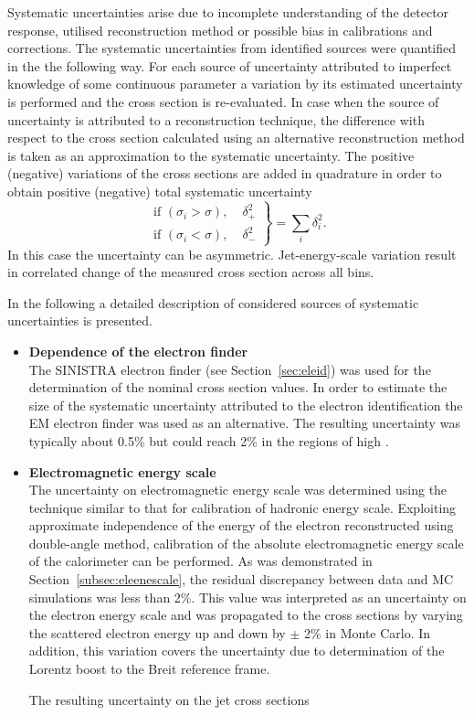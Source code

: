 Systematic uncertainties arise due to incomplete understanding of the detector response, utilised reconstruction method or possible bias in calibrations and corrections. The systematic uncertainties from identified sources were quantified in the the following way. For each source of uncertainty attributed to imperfect knowledge of some continuous parameter a variation by its estimated uncertainty is performed and the cross section is re-evaluated. In case when the source of uncertainty is attributed to a reconstruction technique, the difference with respect to the cross section calculated using an alternative reconstruction method is taken as an approximation to the systematic uncertainty. The positive (negative) variations of the cross sections are added in quadrature in order to obtain positive (negative) total systematic uncertainty
\[
	\left.
		\begin{aligned}
			\text{if $\left(\sigma_i > \sigma\right)$},& \; \delta_+^2\\
			\text{if $\left(\sigma_i < \sigma\right)$},& \; \delta_-^2
		\end{aligned}
	\right\} 
	= \sum_i{\delta_i^2}.
\]
In this case the uncertainty can be asymmetric. Jet-energy-scale variation result in correlated change of the measured cross section across all bins.

In the following a detailed description of considered sources of systematic uncertainties is presented.
\begin{itemize}
	\item \textbf{Dependence of the electron finder}\\
	The \textsc{SINISTRA} electron finder (see Section~\ref{sec:eleid}) was used for the determination of the nominal cross section values. In order to estimate the size of the systematic uncertainty attributed to the electron identification the \textsc{EM} electron finder was used as an alternative. The resulting uncertainty was typically about 0.5\% but could reach 2\% in the regions of high \qsq.
	\item \textbf{Electromagnetic energy scale}\\
	The uncertainty on electromagnetic energy scale was determined using the technique similar to that for calibration of hadronic energy scale. Exploiting approximate independence of the energy of the electron reconstructed using double-angle method, calibration of the absolute electromagnetic energy scale of the calorimeter can be performed. As was demonstrated in Section~\ref{subsec:eleenescale}, the residual discrepancy between data and MC simulations was less than 2\%. This value was interpreted as an uncertainty on the electron energy scale and was propagated to the cross sections by varying the scattered electron energy up and down by $\pm$ 2\% in Monte Carlo. In addition, this variation covers the uncertainty due to determination of the Lorentz boost to the Breit reference frame. 
	
	The resulting uncertainty on the jet cross sections 
\end{itemize}